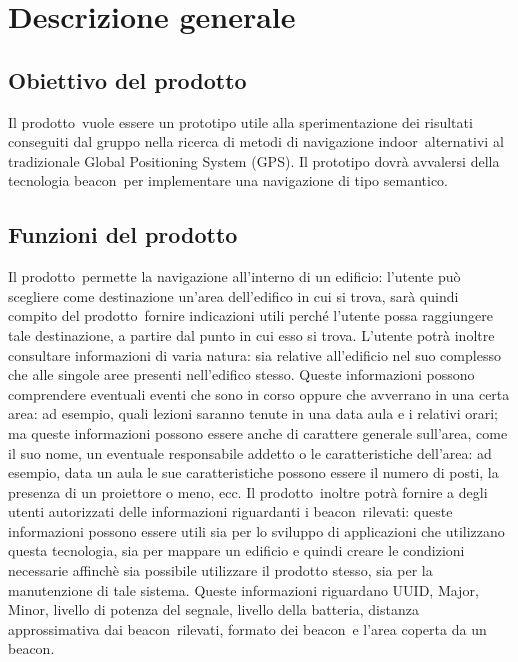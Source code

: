 \documentclass[../AnalisiDeiRequisiti.tex]{subfiles}
\begin{document}
\section{Descrizione generale}
	\subsection{Obiettivo del prodotto}
	Il prodotto\g\ vuole essere un prototipo utile alla sperimentazione dei risultati conseguiti dal gruppo nella ricerca di metodi di navigazione indoor\g\ alternativi al tradizionale Global Positioning System (GPS).
Il prototipo dovrà avvalersi della tecnologia beacon\g\ per implementare una navigazione di tipo semantico.

	\subsection{Funzioni del prodotto}
	Il prodotto\g\ permette la navigazione all'interno di un edificio: l'utente può scegliere come destinazione un'area dell'edifico in cui si trova, sarà quindi compito del prodotto\g\ fornire indicazioni utili perché l'utente possa raggiungere tale destinazione, a partire dal punto in cui esso si trova. L'utente potrà inoltre consultare informazioni di varia natura: sia relative all'edificio nel suo complesso che alle singole aree presenti nell'edifico stesso. Queste informazioni possono comprendere eventuali eventi che sono in corso oppure che avverrano in una certa area: ad esempio, quali lezioni saranno tenute in una data aula e i relativi orari; ma queste informazioni possono essere anche di carattere generale sull'area, come il suo nome, un eventuale responsabile addetto o le caratteristiche dell'area: ad esempio, data un aula le sue caratteristiche possono essere il numero di posti, la presenza di un proiettore o meno, ecc. Il prodotto\g\ inoltre potrà fornire a degli utenti autorizzati delle informazioni riguardanti i beacon\g\ rilevati: queste informazioni possono essere utili sia per lo sviluppo di applicazioni che utilizzano questa tecnologia, sia per mappare un edificio e quindi creare le condizioni necessarie affinchè sia possibile utilizzare il prodotto stesso, sia per la manutenzione di tale sistema. Queste informazioni riguardano UUID, Major, Minor, livello di potenza del segnale, livello della batteria, distanza approssimativa dai beacon\g\ rilevati, formato dei beacon\g\ e l'area coperta da un beacon\g.
		
\end{document}
